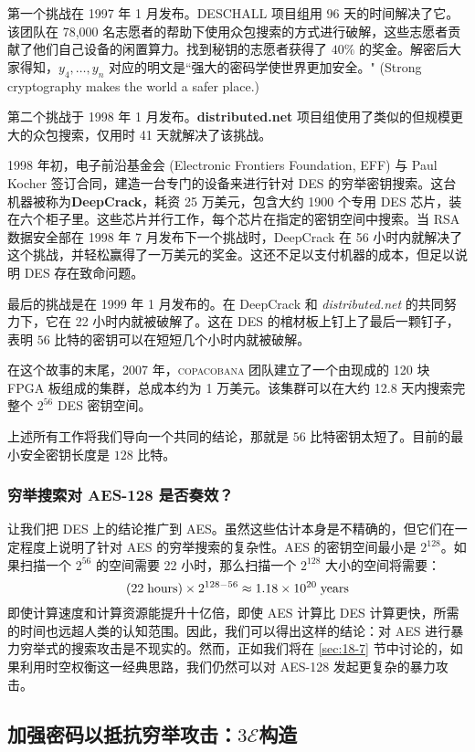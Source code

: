 第一个挑战在 1997 年 1 月发布。DESCHALL 项目组用 96 天的时间解决了它。该团队在 78,000 名志愿者的帮助下使用众包搜索的方式进行破解，这些志愿者贡献了他们自己设备的闲置算力。找到秘钥的志愿者获得了 $40\%$ 的奖金。解密后大家得知，$y_4,\dots,y_n$ 对应的明文是``强大的密码学使世界更加安全。" (Strong cryptography makes the world a safer place.)

第二个挑战于 1998 年 1 月发布。\textbf{distributed.net} 项目组使用了类似的但规模更大的众包搜索，仅用时 41 天就解决了该挑战。

1998 年初，电子前沿基金会 (Electronic Frontiers Foundation, EFF) 与 Paul Kocher 签订合同，建造一台专门的设备来进行针对 DES 的穷举密钥搜索。这台机器被称为\textbf{DeepCrack}，耗资 25 万美元，包含大约 1900 个专用 DES 芯片，装在六个柜子里。这些芯片并行工作，每个芯片在指定的密钥空间中搜索。当 RSA 数据安全部在 1998 年 7 月发布下一个挑战时，DeepCrack 在 56 小时内就解决了这个挑战，并轻松赢得了一万美元的奖金。这还不足以支付机器的成本，但足以说明 DES 存在致命问题。

最后的挑战是在 1999 年 1 月发布的。在 DeepCrack 和 \emph{distributed.net} 的共同努力下，它在 22 小时内就被破解了。这在 DES 的棺材板上钉上了最后一颗钉子，表明 $56$ 比特的密钥可以在短短几个小时内就被破解。

在这个故事的末尾，2007 年，\textsc{copacobana} 团队建立了一个由现成的 120 块 FPGA 板组成的集群，总成本约为 1 万美元。该集群可以在大约 12.8 天内搜索完整个 $2^{56}$ DES 密钥空间。

上述所有工作将我们导向一个共同的结论，那就是 $56$ 比特密钥太短了。目前的最小安全密钥长度是 $128$ 比特。

\subsubsection{穷举搜索对 AES-128 是否奏效？}

让我们把 DES 上的结论推广到 AES。虽然这些估计本身是不精确的，但它们在一定程度上说明了针对 AES 的穷举搜索的复杂性。AES 的密钥空间最小是 $2^{128}$。如果扫描一个 $2^{56}$ 的空间需要 22 小时，那么扫描一个 $2^{128}$ 大小的空间将需要：
\[
(22\;{\rm hours})\times2^{128-56}\approx1.18\times10^{20}\;{\rm years}
\]
即使计算速度和计算资源能提升十亿倍，即使 AES 计算比 DES 计算更快，所需的时间也远超人类的认知范围。因此，我们可以得出这样的结论：对 AES 进行暴力穷举式的搜索攻击是不现实的。然而，正如我们将在 \ref{sec:18-7} 节中讨论的，如果利用时空权衡这一经典思路，我们仍然可以对 AES-128 发起更复杂的暴力攻击。

\subsection{加强密码以抵抗穷举攻击：$3\mathcal{E}$构造}

